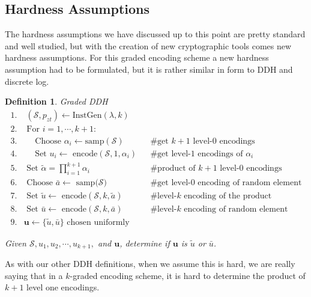 \documentclass[12pt,twoside]{reedthesis}
\newtheorem{definition}{Definition}
\begin{document}
    
    
    
    \subsection{Hardness Assumptions}
    
    The hardness assumptions we have discussed up to this point are pretty standard and well studied, but with the creation of new cryptographic tools comes new hardness assumptions. For this graded encoding scheme a new hardness assumption had to be formulated, but it is rather similar in form to DDH and discrete log.
        
    \begin{definition}{Graded DDH}
    \begin{align*}
    1. &\; (\mathcal{S},p_{zt}) \leftarrow \text{InstGen}(\lambda,k) && \\
    2. & \text{ For } i = 1,\cdots,k+1: && \\
    3. &\quad \text{ Choose } \alpha_i \leftarrow \text{samp}(\mathcal{S}) && \text{\# get $k+1$ level-0 encodings} \\
    4. &\quad \text{ Set $u_i \leftarrow$ encode$(\mathcal{S},1,\alpha_i)$} &&\text{\# get level-1 encodings of $\alpha_i$} \\
    5. & \text{ Set $\tilde{\alpha} = \prod_{i=1}^{k+1}$}\alpha_i &&\text{\# product of $k+1$ level-0 encodings} \\
    6. & \text{ Choose $\bar{a} \leftarrow$ samp($\mathcal{S}$)} &&\text{\# get level-0 encoding of random element} \\
    7. & \text{ Set $\tilde{u} \leftarrow$ encode$(\mathcal{S},k,\tilde{a})$} &&\text{\# level-$k$ encoding of the product} \\
    8. & \text{ Set $\bar{u}\leftarrow$ encode$(\mathcal{S},k,\bar{a})$} &&\text{\# level-$k$ encoding of random element} \\
    9. & \boldsymbol{u} \leftarrow \{\tilde{u},\bar{u} \} \text{ chosen uniformly} &&
    \end{align*}
    \par Given $\mathcal{S},u_1,u_2,\cdots,u_{k+1},$ and $\boldsymbol{u}$, determine if $\boldsymbol{u}$ is $\tilde{u}$ or $\bar{u}$.
    \end{definition}
    
    As with our other DDH definitions, when we assume this is hard, we are really saying that in a $k$-graded encoding scheme, it is hard to determine the product of $k+1$ level one encodings. 
    
\end{document}

